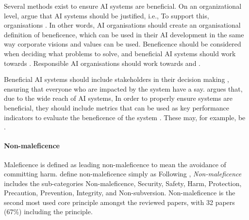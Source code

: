 Several methods exist to ensure AI systems are beneficial. On an organizational level, \textcite[p.~2151]{Morley_2020} argue that AI systems should be justified, i.e.,  To support this, organisations  \parencite[p.~9]{vanBruxvoort_2021}. In other words, AI organisations should create an organisational definition of beneficence, which can be used in their AI development in the same way corporate visions and values can be used. Beneficence should be considered when deciding what problems to solve, and beneficial AI systems should work towards  \parencite[p.~73]{Ryan_2021}. Responsible AI organisations should work towards   and  \parencite[p.~11]{Jobin_2019}.

Beneficial AI systems should include stakeholders in their decision making \parencite{Lu_2022,Havrda_2020,Morley_2020}, ensuring that everyone who are impacted by the system have a say. \textcite[p.~134]{Nevanperä_2021} argues that, due to the wide reach of AI systems,  In order to properly ensure systems are beneficial, they should include metrics that can be used as key performance indicators to evaluate the beneficence of the system \parencite{Eitel-Porter_2021}. These may, for example, be  \parencite[p.~5]{Havrda_2020}.


\paragraph{Non-maleficence}
Maleficence is defined as  leading non-maleficence to mean the avoidance of committing harm. \textcite[p.~697]{Floridi_2018} define non-maleficence simply as  Following \textcite{Ryan_2021}, \textit{Non-maleficence} includes the sub-categories Non-maleficence, Security, Safety, Harm, Protection, Precaution, Prevention, Integrity, and Non-subversion. Non-maleficence is the second most used core principle amongst the reviewed papers, with 32 papers (67\%) including the principle.

